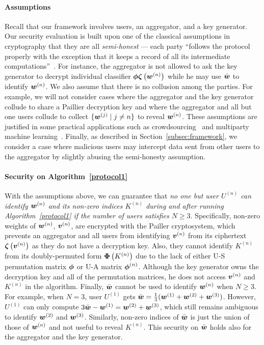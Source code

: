 \documentclass[10pt,twocolumn,letterpaper]{article}
\def\vct#1{\mbox{\boldmath $#1$}}
\def\ui#1{^{(#1)}}
\def\perm{\vct{\phi}}
\def\he#1{\vct{\zeta}\left(#1\right)}
\def\dperm#1{\vct{\Phi}\left(#1\right)}
\begin{document}
\paragraph{Assumptions}
Recall that our framework involves users, an aggregator, and a key generator. Our security evaluation is built upon one of the classical assumptions in cryptography that they are all \emph{semi-honest} --- each party ``follows the protocol properly with the exception that it keeps a record of all its intermediate computations''~\cite{OdedGoldreich2004}. For instance, the aggregator is not allowed to ask the key generator to decrypt individual classifier $\perm\he{\vct{w}\ui{n}}$ while he may use $\bar{\vct{w}}$ to identify $\vct{w}\ui{n}$. We also assume that there is no collusion among the parties. For example, we will not consider cases where the aggregator and the key generator collude to share a Paillier decryption key and where the aggregator and all but one users collude to collect $\{\vct{w}\ui{j}\mid j\neq n\}$ to reveal $\vct{w}\ui{n}$. These assumptions are justified in some practical applications such as crowdsourcing~\cite{Kajino2014a} and multiparty machine learning~\cite{Pathak2010a}. Finally, as described in Section~\ref{subsec:framework}, we consider a case where malicious users may intercept data sent from other users to the aggregator by slightly abusing the semi-honesty assumption.

\paragraph{Security on Algorithm~\ref{protocol1}}
With the assumptions above, we can guarantee that \emph{no one but user $U\ui{n}$ can identify $\vct{w}\ui{n}$ and its non-zero indices $K\ui{n}$ during and after running Algorithm~\ref{protocol1} if the number of users satisfies $N\geq 3$}. Specifically, non-zero weights of $\vct{w}\ui{n}$, $\vct{v}\ui{n}$, are encrypted with the Pailler cryptosystem, which prevents an aggregator and all users from identifying $\vct{v}\ui{n}$ from its ciphertext $\he{\vct{v}\ui{n}}$ as they do not have a decryption key. Also, they cannot identify $K\ui{n}$ from its doubly-permuted form $\dperm{K\ui{n}}$ due to the lack of either U-S permutation matrix $\perm$ or U-A matrix $\perm\ui{n}$. Although the key generator owns the decryption key and all of the permutation matrices, he does not access $\vct{v}\ui{n}$ and $K\ui{n}$ in the algorithm. Finally, $\bar{\vct{w}}$ cannot be used to identify $\vct{w}\ui{n}$ when $N\geq 3$. For example, when $N=3$, user $U\ui{1}$ gets $\bar{\vct{w}}=\frac{1}{3}(\vct{w}\ui{1} + \vct{w}\ui{2} + \vct{w}\ui{3})$. However, $U\ui{1}$ can only compute $3\bar{\vct{w}} - \vct{w}\ui{1} = \vct{w}\ui{2} + \vct{w}\ui{3}$, which still remains ambiguous to identify $\vct{w}\ui{2}$ and $\vct{w}\ui{3}$. Similarly, non-zero indices of $\bar{\vct{w}}$ is just the union of those of $\vct{w}\ui{n}$ and not useful to reveal $K\ui{n}$. This security on $\bar{\vct{w}}$ holds also for the aggregator and the key generator.
\end{document}
